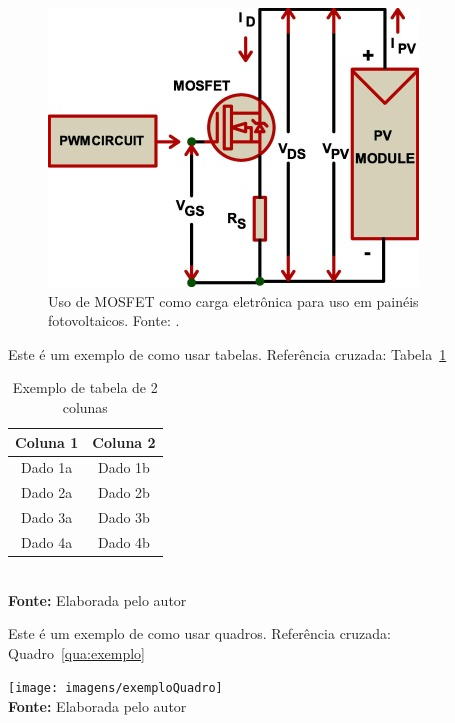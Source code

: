 \FloatBarrier
\begin{figure}[!htbp]
	\centering
	\includegraphics[scale=1]{imagens/MOSFET_LOAD}
	\caption{Uso de MOSFET como carga eletrônica para uso em painéis fotovoltaicos. Fonte: . }
	
	\label{fig:CargaELE}
\end{figure}
\FloatBarrier




Este é um exemplo de como usar tabelas. Referência cruzada: Tabela~\ref{tab:exemplo}

\FloatBarrier
\begin{table}[!htbp]
\centering
\caption{Exemplo de tabela de 2 colunas}
	\begin{tabular}{ c | c }
		\hline
		\textbf{Coluna 1} & \textbf{Coluna 2} \\ \hline
		Dado 1a           & Dado 1b           \\ \hline
		Dado 2a           & Dado 2b           \\ \hline
		Dado 3a           & Dado 3b           \\ \hline
		Dado 4a           & Dado 4b           \\ \hline
	\end{tabular}
	\\ \vspace{0.2cm}
	\textbf{Fonte:} Elaborada pelo autor
	\label{tab:exemplo}
\end{table}
\FloatBarrier


Este é um exemplo de como usar quadros. Referência cruzada: Quadro~\ref{qua:exemplo}

\FloatBarrier
\begin{quadro}[!htbp]
	\centering
	\caption{Exemplo de quadro}
	\texttt{[image: imagens/exemploQuadro]}
	\\\textbf{Fonte:} Elaborada pelo autor
	\label{qua:exemplo}
\end{quadro}
\FloatBarrier


